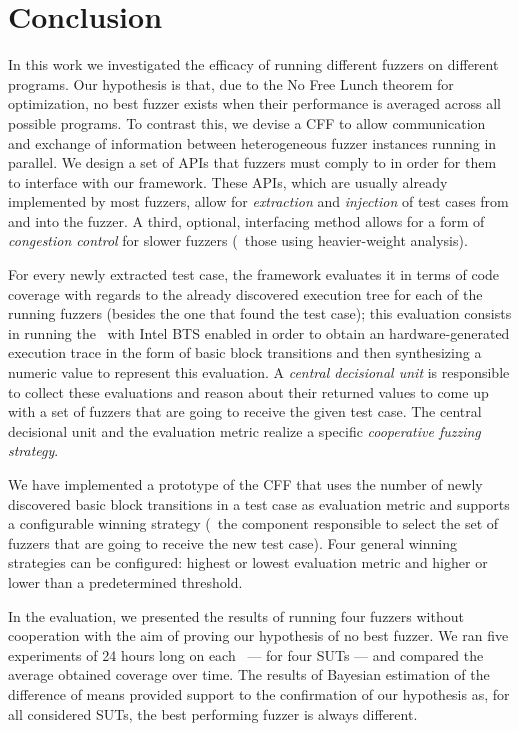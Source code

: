 \chapter{Conclusion}
\label{chap:conclusion}

In this work we investigated the efficacy of running different fuzzers on
different programs. Our hypothesis is that, due to the No Free Lunch theorem for
optimization, no best fuzzer exists when their performance is averaged across
all possible programs. To contrast this, we devise a \acf{CFF} to allow
communication and exchange of information between heterogeneous fuzzer instances
running in parallel. We design a set of \acp{API} that fuzzers must comply to in
order for them to interface with our framework. These \acp{API}, which are
usually already implemented by most fuzzers, allow for \emph{extraction} and
\emph{injection} of test cases from and into the fuzzer. A third, optional,
interfacing method allows for a form of \emph{congestion control} for slower
fuzzers (\eg~those using heavier-weight analysis).

For every newly extracted test case, the framework evaluates it in terms of code
coverage with regards to the already discovered execution tree for each of the
running fuzzers (besides the one that found the test case); this evaluation
consists in running the \sut\ with Intel \ac{BTS} enabled in order to obtain an
hardware-generated execution trace in the form of basic block transitions and
then synthesizing a numeric value to represent this evaluation. A \emph{central
decisional unit} is responsible to collect these evaluations and reason about
their returned values to come up with a set of fuzzers that are going to receive
the given test case. The central decisional unit and the evaluation metric
realize a specific \emph{cooperative fuzzing strategy}.

We have implemented a prototype of the \ac{CFF} that uses the number of newly
discovered basic block transitions in a test case as evaluation metric and
supports a configurable winning strategy (\ie~the component responsible to
select the set of fuzzers that are going to receive the new test case). Four
general winning strategies can be configured: highest or lowest evaluation
metric and higher or lower than a predetermined threshold.

In the evaluation, we presented the results of running four fuzzers without
cooperation with the aim of proving our hypothesis of no best fuzzer. We ran
five experiments of 24 hours long on each \sut\ --- for four \acp{SUT} --- and
compared the average obtained coverage over time. The results of Bayesian
estimation of the difference of means provided support to the confirmation of
our hypothesis as, for all considered \acp{SUT}, the best performing fuzzer is
always different.

